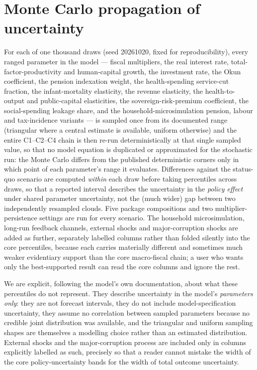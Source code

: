 \documentclass[11pt,a4paper]{article}
\begin{document}
\section{Monte Carlo propagation of uncertainty}
\label{sec:montecarlo}

For each of one thousand draws (seed 20261020, fixed for reproducibility), every ranged parameter in the model --- fiscal multipliers, the real interest rate, total-factor-productivity and human-capital growth, the investment rate, the Okun coefficient, the pension indexation weight, the health-spending service-cut fraction, the infant-mortality elasticity, the revenue elasticity, the health-to-output and public-capital elasticities, the sovereign-risk-premium coefficient, the social-spending leakage share, and the household-microsimulation pension, labour and tax-incidence variants --- is sampled once from its documented range (triangular where a central estimate is available, uniform otherwise) and the entire \textsc{C1}--\textsc{C2}--\textsc{C4} chain is then re-run deterministically at that single sampled value, so that no model equation is duplicated or approximated for the stochastic run: the Monte Carlo differs from the published deterministic corners only in which point of each parameter's range it evaluates. Differences against the status-quo scenario are computed \emph{within} each draw before taking percentiles across draws, so that a reported interval describes the uncertainty in the \emph{policy effect} under shared parameter uncertainty, not the (much wider) gap between two independently resampled clouds. Five package compositions and two multiplier-persistence settings are run for every scenario. The household microsimulation, long-run feedback channels, external shocks and major-corruption shocks are added as further, separately labelled columns rather than folded silently into the core percentiles, because each carries materially different and sometimes much weaker evidentiary support than the core macro-fiscal chain; a user who wants only the best-supported result can read the core columns and ignore the rest.

We are explicit, following the model's own documentation, about what these percentiles do not represent. They describe uncertainty in the model's \emph{parameters only}: they are not forecast intervals, they do not include model-specification uncertainty, they assume no correlation between sampled parameters because no credible joint distribution was available, and the triangular and uniform sampling shapes are themselves a modelling choice rather than an estimated distribution. External shocks and the major-corruption process are included only in columns explicitly labelled as such, precisely so that a reader cannot mistake the width of the core policy-uncertainty bands for the width of total outcome uncertainty.
\end{document}
